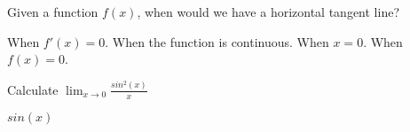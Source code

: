 \documentclass[addpoints, 12pt]{exam}%
\begin{document}
\begin{questions}
\newpage

\question[1]

Given a function $f(x)$, when would we have a horizontal tangent line?

\begin{choices}
\CorrectChoice When $f'(x) = 0$.
\choice When the function is continuous. 
\choice When $x = 0$.
\choice When $f(x) = 0$.

\end{choices}

\question[1]

Calculate $\lim_{x \to 0} \frac{sin^2(x)}{x}$

\begin{choices}
\choice $sin(x)$
\end{choices}


\end{questions}
\end{document}
